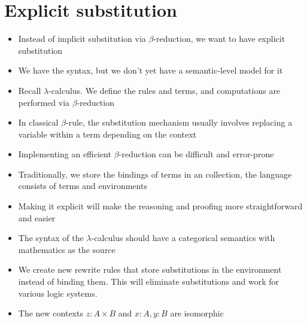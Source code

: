 \documentclass[11pt]{article}
\begin{document}
\section{Explicit substitution}
\begin{itemize}
    \item Instead of implicit substitution via $\beta$-reduction, we want to have explicit substitution
    \item We have the syntax, but we don't yet have a semantic-level model for it
    \item Recall $\lambda$-calculus. We define the rules and terms, and computations are performed via $\beta$-reduction
    \item In classical $\beta$-rule, the substitution mechanism usually involves replacing a variable within a term depending on the context
    \item Implementing an efficient $\beta$-reduction can be difficult and error-prone
    \item Traditionally, we store the bindings of terms in an collection, the language consists of terms and environments
    \item Making it explicit will make the reasoning and proofing more straightforward and easier
    \item The syntax of the $\lambda$-calculus should have a categorical semantics with mathematics as the source
    \item We create new rewrite rules that store substitutions in the environment instead of binding them. This will eliminate substitutions and work for various logic systems.
    \item The new contexts $z : A \times B$ and $x : A, y : B$ are isomorphic
\end{itemize}
\end{document}
